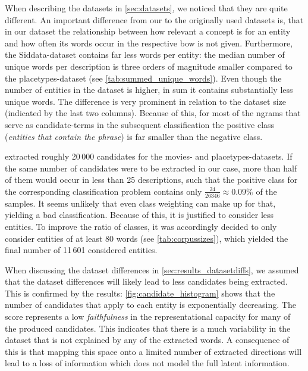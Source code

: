 \vspace{-1.1ex}
When describing the datasets in \autoref{sec:datasets}, we noticed that they are quite different. An important difference from our to the originally used datasets is, that in our dataset the relationship between how relevant a concept is for an entity and how often its words occur in the respective \gls{bow} is not given. Furthermore, the Siddata-dataset contains far less words per entity: the median number of unique words per description is three orders of magnitude smaller compared to the placetypes-dataset (see \autoref{tab:summed_unique_words}). Even though the number of entities in the dataset is higher, in sum it contains substantially less unique words. The difference is very prominent in relation to the dataset size (indicated by the last two columns). Because of this, for most of the \glspl{ngram} that serve as candidate-terms in the subsequent classification the positive class (\textit{entities that contain the phrase}) is far smaller than the negative class. 

\textcite{Derrac2015} extracted roughly 20\,000 candidates for the movies- and placetypes-datasets. If the same number of candidates were to be extracted in our case, more than half of them would occur in less than 25 descriptions, such that the positive class for the corresponding classification problem contains only $\frac{24}{26346} \approx 0.09\%$ of the samples. It seems unlikely that even class weighting can make up for that, yielding a bad classification. Because of this, it is justified to consider less entities. To improve the ratio of classes, it was accordingly decided to only consider entities of at least 80 words (see \autoref{tab:corpussizes}), which yielded the final number of 11\,601 considered entities. 

When discussing the dataset differences in \autoref{sec:results_datasetdiffs}, we assumed that the dataset differences will likely lead to less candidates being extracted. This is confirmed by the results: \autoref{fig:candidate_histogram} shows that the number of candidates that apply to each entity is exponentially decreasing. The score represents a low \textit{faithfulness} in the representational capacity for many of the produced candidates. This indicates that there is a much variability in the dataset that is not explained by any of the extracted words. A consequence of this is that mapping this space onto a limited number of extracted directions will lead to a loss of information which does not model the full latent information.


